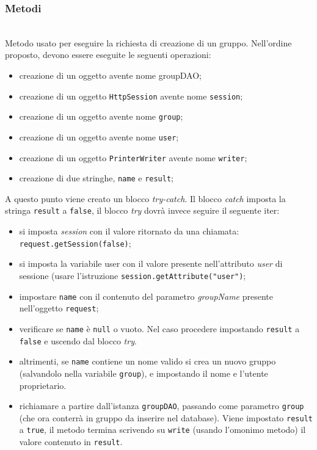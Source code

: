 \subsubsection*{Metodi}
\begin{description}
	\item{}\\	
	Metodo usato per eseguire la richiesta di creazione di un gruppo. Nell'ordine proposto, devono essere eseguite le seguenti operazioni:
	\begin{itemize}
		\item creazione di un oggetto  avente nome groupDAO;
		\item creazione di un oggetto \texttt{HttpSession} avente nome \texttt{session};
		\item creazione di un oggetto  avente nome \texttt{group};
		\item creazione di un oggetto  avente nome \texttt{user};
		\item creazione di un oggetto \texttt{PrinterWriter} avente nome \texttt{writer};
		\item creazione di due stringhe, \texttt{name} e \texttt{result};
	\end{itemize}
	A questo punto viene creato un blocco \textit{try-catch}. Il blocco \textit{catch} imposta la stringa \texttt{result} a \texttt{false}, il blocco \textit{try} dovrà invece seguire il seguente iter:
	\begin{itemize}
		\item si imposta \textit{session} con il valore ritornato da una chiamata:\\
		\verb|request.getSession(false)|;
		\item si imposta la variabile user con il valore presente nell'attributo \textit{user} di sessione (usare l'istruzione \verb|session.getAttribute("user")|;
		\item impostare \texttt{name} con il contenuto del parametro \textit{groupName} presente nell'oggetto \texttt{request};
		\item verificare se \texttt{name} è \texttt{null} o vuoto. Nel caso procedere impostando \texttt{result} a \texttt{false} e uscendo dal blocco \textit{try}.
		\item altrimenti, se \texttt{name} contiene un nome valido si crea un nuovo gruppo (salvandolo nella variabile \texttt{group}), e impostando il nome e l'utente proprietario.
		\item richiamare  a partire dall'istanza \texttt{groupDAO}, passando come parametro \texttt{group} (che ora conterrà in gruppo da inserire nel database). Viene impostato \texttt{result} a \texttt{true},
	il metodo termina scrivendo su \texttt{write} (usando l'omonimo metodo) il valore contenuto in \texttt{result}. 		
	\end{itemize}
	
\end{description}

